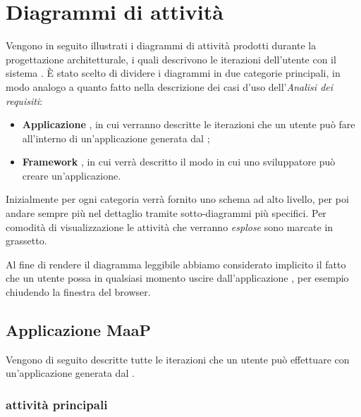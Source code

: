 \section{Diagrammi di attività}

Vengono in seguito illustrati i diagrammi di attività prodotti durante la progettazione architetturale, i quali descrivono le iterazioni dell'utente con il sistema . È stato scelto di dividere i diagrammi in due categorie principali, in modo analogo a quanto fatto nella descrizione dei casi d'uso dell'\textit{Analisi dei requisiti}:

\begin{itemize}

	\item \textbf{Applicazione }, in cui verranno descritte le iterazioni che un utente può fare all'interno di un'applicazione generata dal ;
	\item \textbf{Framework }, in cui verrà descritto il modo in cui uno sviluppatore può creare un'applicazione.

\end{itemize}

Inizialmente per ogni categoria verrà fornito uno schema ad alto livello, per poi andare sempre più nel dettaglio tramite sotto-diagrammi più specifici. Per comodità di visualizzazione le attività che verranno \textit{esplose} sono marcate in grassetto. 

Al fine di rendere il diagramma leggibile abbiamo considerato implicito il fatto che un utente possa in qualsiasi momento uscire dall'applicazione , per esempio chiudendo la finestra del browser.

\subsection{Applicazione MaaP}

Vengono di seguito descritte tutte le iterazioni che un utente può effettuare con un'applicazione generata dal  .


\subsubsection{attività principali}

